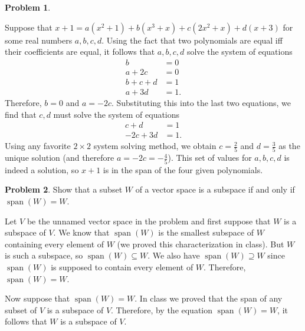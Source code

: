 \documentclass[11pt,oneside]{amsart}
\theoremstyle{definition}
\newtheorem{problem}{Problem}
\DeclareMathOperator{\Span}{span}
\begin{document}
\begin{problem}
\begin{enumerate}[(a)]
            \begin{solution}
                Suppose that $x+1=a(x^2+1)+b(x^3+x)+c(2x^2+x)+d(x+3)$ for some real numbers $a,b,c,d$. Using the fact that two polynomials are equal iff their coefficients are equal, it follows that $a,b,c,d$ solve the system of equations
                \begin{align*}
                    b &= 0\\
                    a+2c &= 0\\
                    b+c+d &= 1\\
                    a+3d &= 1.
                \end{align*}
                Therefore, $b=0$ and $a=-2c$. Substituting this into the last two equations, we find that $c,d$ must solve the system of equations
                \begin{align*}
                    c+d &= 1\\
                    -2c+3d &= 1.
                \end{align*}
                Using any favorite $2\times 2$ system solving method, we obtain $c=\frac 25$ and $d=\frac 35$ as the unique solution (and therefore $a=-2c=-\frac 45$). This set of values for $a,b,c,d$ is indeed a solution, so $x+1$ is in the span of the four given polynomials.
            \end{solution}
        \end{enumerate}
    \end{problem}

    \begin{problem}
        Show that a subset $W$ of a vector space is a subspace if and only if $\Span(W)=W$.
    \end{problem}
    \begin{solution}
        Let $V$ be the unnamed vector space in the problem and first suppose that $W$ is a subspace of $V$. We know that $\Span(W)$ is the smallest subspace of $W$ containing every element of $W$ (we proved this characterization in class). But $W$ is such a subspace, so $\Span(W)\subseteq W$. We also have $\Span(W)\supseteq W$ since $\Span(W)$ is supposed to contain every element of $W$. Therefore, $\Span(W)=W$.

        Now suppose that $\Span(W)=W$. In class we proved that the span of any subset of $V$ is a subspace of $V$. Therefore, by the equation $\Span(W)=W$, it follows that $W$ is a subspace of $V$.
    \end{solution}
\end{document}
